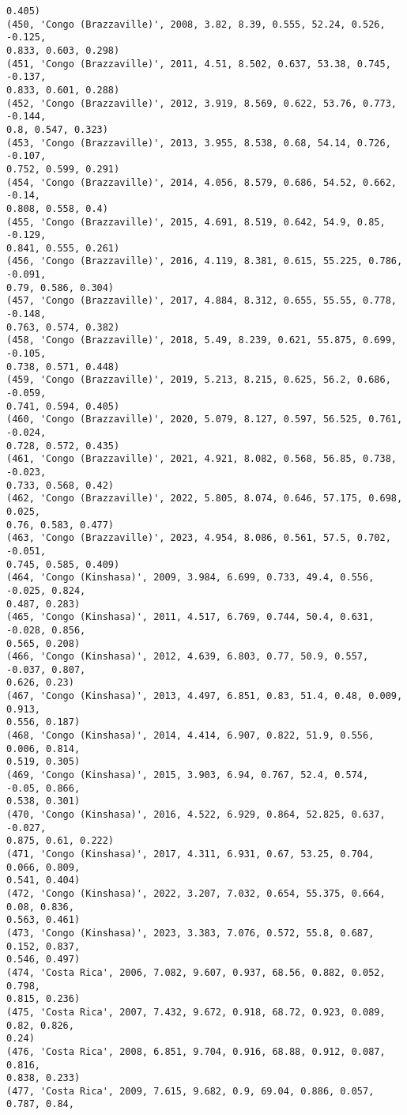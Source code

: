 \documentclass[11pt]{article}
\begin{document}
\begin{Verbatim}[commandchars=\\\{\}]
0.405)
(450, 'Congo (Brazzaville)', 2008, 3.82, 8.39, 0.555, 52.24, 0.526, -0.125,
0.833, 0.603, 0.298)
(451, 'Congo (Brazzaville)', 2011, 4.51, 8.502, 0.637, 53.38, 0.745, -0.137,
0.833, 0.601, 0.288)
(452, 'Congo (Brazzaville)', 2012, 3.919, 8.569, 0.622, 53.76, 0.773, -0.144,
0.8, 0.547, 0.323)
(453, 'Congo (Brazzaville)', 2013, 3.955, 8.538, 0.68, 54.14, 0.726, -0.107,
0.752, 0.599, 0.291)
(454, 'Congo (Brazzaville)', 2014, 4.056, 8.579, 0.686, 54.52, 0.662, -0.14,
0.808, 0.558, 0.4)
(455, 'Congo (Brazzaville)', 2015, 4.691, 8.519, 0.642, 54.9, 0.85, -0.129,
0.841, 0.555, 0.261)
(456, 'Congo (Brazzaville)', 2016, 4.119, 8.381, 0.615, 55.225, 0.786, -0.091,
0.79, 0.586, 0.304)
(457, 'Congo (Brazzaville)', 2017, 4.884, 8.312, 0.655, 55.55, 0.778, -0.148,
0.763, 0.574, 0.382)
(458, 'Congo (Brazzaville)', 2018, 5.49, 8.239, 0.621, 55.875, 0.699, -0.105,
0.738, 0.571, 0.448)
(459, 'Congo (Brazzaville)', 2019, 5.213, 8.215, 0.625, 56.2, 0.686, -0.059,
0.741, 0.594, 0.405)
(460, 'Congo (Brazzaville)', 2020, 5.079, 8.127, 0.597, 56.525, 0.761, -0.024,
0.728, 0.572, 0.435)
(461, 'Congo (Brazzaville)', 2021, 4.921, 8.082, 0.568, 56.85, 0.738, -0.023,
0.733, 0.568, 0.42)
(462, 'Congo (Brazzaville)', 2022, 5.805, 8.074, 0.646, 57.175, 0.698, 0.025,
0.76, 0.583, 0.477)
(463, 'Congo (Brazzaville)', 2023, 4.954, 8.086, 0.561, 57.5, 0.702, -0.051,
0.745, 0.585, 0.409)
(464, 'Congo (Kinshasa)', 2009, 3.984, 6.699, 0.733, 49.4, 0.556, -0.025, 0.824,
0.487, 0.283)
(465, 'Congo (Kinshasa)', 2011, 4.517, 6.769, 0.744, 50.4, 0.631, -0.028, 0.856,
0.565, 0.208)
(466, 'Congo (Kinshasa)', 2012, 4.639, 6.803, 0.77, 50.9, 0.557, -0.037, 0.807,
0.626, 0.23)
(467, 'Congo (Kinshasa)', 2013, 4.497, 6.851, 0.83, 51.4, 0.48, 0.009, 0.913,
0.556, 0.187)
(468, 'Congo (Kinshasa)', 2014, 4.414, 6.907, 0.822, 51.9, 0.556, 0.006, 0.814,
0.519, 0.305)
(469, 'Congo (Kinshasa)', 2015, 3.903, 6.94, 0.767, 52.4, 0.574, -0.05, 0.866,
0.538, 0.301)
(470, 'Congo (Kinshasa)', 2016, 4.522, 6.929, 0.864, 52.825, 0.637, -0.027,
0.875, 0.61, 0.222)
(471, 'Congo (Kinshasa)', 2017, 4.311, 6.931, 0.67, 53.25, 0.704, 0.066, 0.809,
0.541, 0.404)
(472, 'Congo (Kinshasa)', 2022, 3.207, 7.032, 0.654, 55.375, 0.664, 0.08, 0.836,
0.563, 0.461)
(473, 'Congo (Kinshasa)', 2023, 3.383, 7.076, 0.572, 55.8, 0.687, 0.152, 0.837,
0.546, 0.497)
(474, 'Costa Rica', 2006, 7.082, 9.607, 0.937, 68.56, 0.882, 0.052, 0.798,
0.815, 0.236)
(475, 'Costa Rica', 2007, 7.432, 9.672, 0.918, 68.72, 0.923, 0.089, 0.82, 0.826,
0.24)
(476, 'Costa Rica', 2008, 6.851, 9.704, 0.916, 68.88, 0.912, 0.087, 0.816,
0.838, 0.233)
(477, 'Costa Rica', 2009, 7.615, 9.682, 0.9, 69.04, 0.886, 0.057, 0.787, 0.84,

\end{Verbatim}
\end{document}

